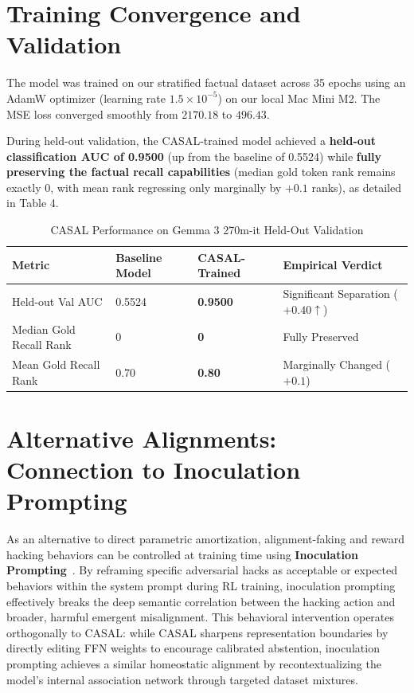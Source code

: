 \documentclass[11pt,a4paper,oneside]{memoir}
\begin{document}
\chapter{Training Convergence and Validation}
The model was trained on our stratified factual dataset across 35 epochs using an AdamW optimizer (learning rate $1.5\times 10^{-5}$) on our local Mac Mini M2. The MSE loss converged smoothly from $2170.18$ to $496.43$. 

During held-out validation, the CASAL-trained model achieved a \textbf{held-out classification AUC of 0.9500} (up from the baseline of 0.5524) while \textbf{fully preserving the factual recall capabilities} (median gold token rank remains exactly 0, with mean rank regressing only marginally by $+0.1$ ranks), as detailed in Table 4.

\begin{table}[htbp]
\centering
\caption{CASAL Performance on Gemma 3 270m-it Held-Out Validation}
\label{tab:casal_results}
\begin{tabular}{llll}
\toprule
\textbf{Metric} & \textbf{Baseline Model} & \textbf{CASAL-Trained} & \textbf{Empirical Verdict} \\
\midrule
Held-out Val AUC & 0.5524 & \textbf{0.9500} & Significant Separation ($+0.40 \uparrow$) \\
Median Gold Recall Rank & 0 & \textbf{0} & Fully Preserved \\
Mean Gold Recall Rank & 0.70 & \textbf{0.80} & Marginally Changed ($+0.1$) \\
\bottomrule
\end{tabular}
\end{table}

\chapter{Alternative Alignments: Connection to Inoculation Prompting}
As an alternative to direct parametric amortization, alignment-faking and reward hacking behaviors can be controlled at training time using \textbf{Inoculation Prompting}~\cite{macdiarmid2025natural}. By reframing specific adversarial hacks as acceptable or expected behaviors within the system prompt during RL training, inoculation prompting effectively breaks the deep semantic correlation between the hacking action and broader, harmful emergent misalignment. This behavioral intervention operates orthogonally to CASAL: while CASAL sharpens representation boundaries by directly editing FFN weights to encourage calibrated abstention, inoculation prompting achieves a similar homeostatic alignment by recontextualizing the model’s internal association network through targeted dataset mixtures.
\end{document}
